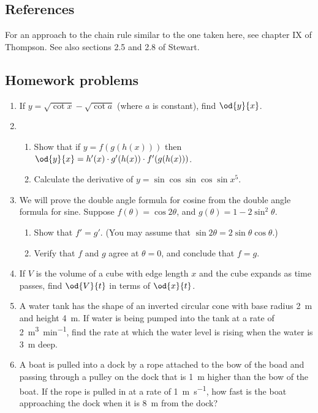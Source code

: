 \subsection{References}
For an approach to the chain rule similar to the one taken here, see chapter IX of Thompson. See also sections 2.5 and 2.8 of Stewart.

\subsection{Homework problems}
\begin{enumerate}
  \item If $ y = \sqrt{\cot x} - \sqrt{\cot a} $ (where $ a $ is constant), find $ \od{y}{x} $.
  \item
    \begin{enumerate}
      \item Show that if $ y = f(g(h(x))) $ then $ \od{y}{x} = h'(x) \cdot g'(h(x)) \cdot f'(g(h(x))) $.
      \item Calculate the derivative of $ y = \sin \cos \sin \cos \sin x^5 $.
    \end{enumerate}
  \item We will prove the double angle formula for cosine from the double angle formula for sine.
            Suppose $ f(\theta) = \cos 2\theta $, and $ g(\theta) =  1 - 2\sin^2 \theta $.
    \begin{enumerate}
      \item Show that $ f' = g' $. (You may assume that $ \sin 2\theta = 2\sin \theta \cos \theta $.)
      \item Verify that $ f $ and $ g $ agree at $ \theta = 0 $, and conclude that $ f = g $.
    \end{enumerate}
  \item If $ V $ is the volume of a cube with edge length $ x $ and the cube expands as time passes,
        find $ \od{V}{t} $ in terms of $ \od{x}{t} $.
  \item A water tank has the shape of an inverted circular cone with base radius \SI{2}{\metre}
        and height \SI{4}{\metre}. If water is being pumped into the tank at a rate of \SI{2}{\metre\cubed\per\minute},
        find the rate at which the water level is rising when the water is \SI{3}{\metre} deep.
  \item A boat is pulled into a dock by a rope attached to the bow of the boad and passing through a pulley on
        the dock that is \SI{1}{\metre} higher than the bow of the boat. If the rope is pulled in at a rate
        of \SI{1}{\metre\per\second}, how fast is the boat approaching the dock when it is \SI{8}{\metre} from the dock?
\end{enumerate}

